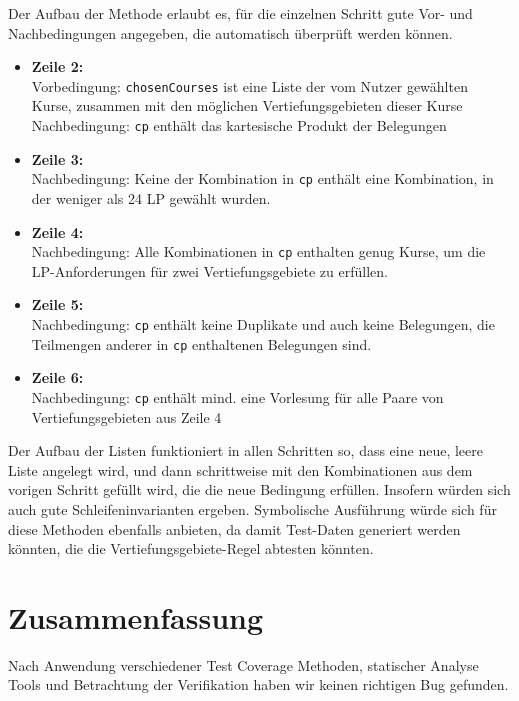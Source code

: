 \documentclass[ngerman]{article}
\begin{document}
Der Aufbau der Methode erlaubt es, für die einzelnen Schritt gute Vor- und Nachbedingungen angegeben, die automatisch überprüft werden können.
\begin{itemize}
    \item
        \textbf{Zeile 2:} \\
        Vorbedingung: \texttt{chosenCourses} ist eine Liste der vom Nutzer gewählten Kurse, zusammen mit den möglichen Vertiefungsgebieten dieser Kurse
        Nachbedingung: \texttt{cp} enthält das kartesische Produkt der Belegungen
    \item
        \textbf{Zeile 3:} \\
        Nachbedingung: Keine der Kombination in \texttt{cp} enthält eine Kombination, in der weniger als 24 LP gewählt wurden.
    \item
        \textbf{Zeile 4:} \\
        Nachbedingung: Alle Kombinationen in \texttt{cp} enthalten genug Kurse, um die LP-Anforderungen für zwei Vertiefungsgebiete zu erfüllen.
    \item
        \textbf{Zeile 5:} \\
        Nachbedingung: \texttt{cp} enthält keine Duplikate und auch keine Belegungen, die Teilmengen anderer in \texttt{cp} enthaltenen Belegungen sind.
    \item
        \textbf{Zeile 6:} \\
        Nachbedingung: \texttt{cp} enthält mind. eine Vorlesung für alle Paare von Vertiefungsgebieten aus Zeile 4
\end{itemize}
Der Aufbau der Listen funktioniert in allen Schritten so, dass eine neue, leere Liste angelegt wird, und dann schrittweise mit den Kombinationen aus dem vorigen Schritt gefüllt wird, die die neue Bedingung erfüllen.
Insofern würden sich auch gute Schleifeninvarianten ergeben.
Symbolische Ausführung würde sich für diese Methoden ebenfalls anbieten, da damit Test-Daten generiert werden könnten, die die Vertiefungsgebiete-Regel abtesten könnten.

\section{Zusammenfassung}

Nach Anwendung verschiedener Test Coverage Methoden, statischer Analyse Tools und Betrachtung der Verifikation haben wir keinen richtigen Bug gefunden. 
\end{document}
